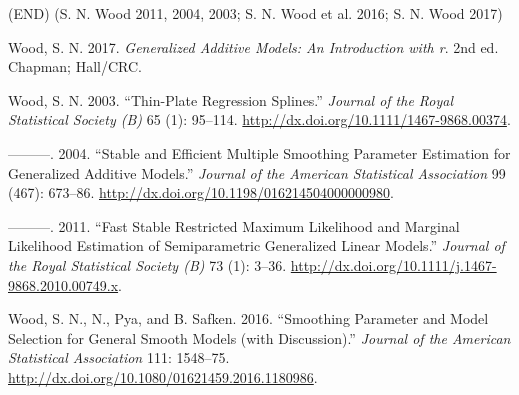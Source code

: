 \documentclass[
  10pt,
]{article}
\newlength{\cslhangindent}
\newlength{\cslentryspacingunit} %
\newenvironment{CSLReferences}[2] %
 {%
  \setlength{\parindent}{0pt}
  \ifodd #1
  \let\oldpar\par
  \def\par{\hangindent=\cslhangindent\oldpar}
  \fi
  \setlength{\parskip}{#2\cslentryspacingunit}
 }%
 {}
\begin{document}
\setlength{\intextsep}{\oldintextsep}

\lipsum (END) (S. N. Wood 2011, 2004, 2003; S. N. Wood et al. 2016; S. N. Wood 2017)

\hypertarget{refs}{}
\begin{CSLReferences}{1}{0}
\leavevmode{}%
Wood, S. N. 2017. \emph{Generalized Additive Models: An Introduction with r}. 2nd ed. Chapman; Hall/CRC.

\leavevmode{}%
Wood, S. N. 2003. {``Thin-Plate Regression Splines.''} \emph{Journal of the Royal Statistical Society (B)} 65 (1): 95--114. \url{http://dx.doi.org/10.1111/1467-9868.00374}.

\leavevmode{}%
---------. 2004. {``Stable and Efficient Multiple Smoothing Parameter Estimation for Generalized Additive Models.''} \emph{Journal of the American Statistical Association} 99 (467): 673--86. \url{http://dx.doi.org/10.1198/016214504000000980}.

\leavevmode{}%
---------. 2011. {``Fast Stable Restricted Maximum Likelihood and Marginal Likelihood Estimation of Semiparametric Generalized Linear Models.''} \emph{Journal of the Royal Statistical Society (B)} 73 (1): 3--36. \url{http://dx.doi.org/10.1111/j.1467-9868.2010.00749.x}.

\leavevmode{}%
Wood, S. N., N., Pya, and B. Safken. 2016. {``Smoothing Parameter and Model Selection for General Smooth Models (with Discussion).''} \emph{Journal of the American Statistical Association} 111: 1548--75. \url{http://dx.doi.org/10.1080/01621459.2016.1180986}.

\end{CSLReferences}
\end{document}
